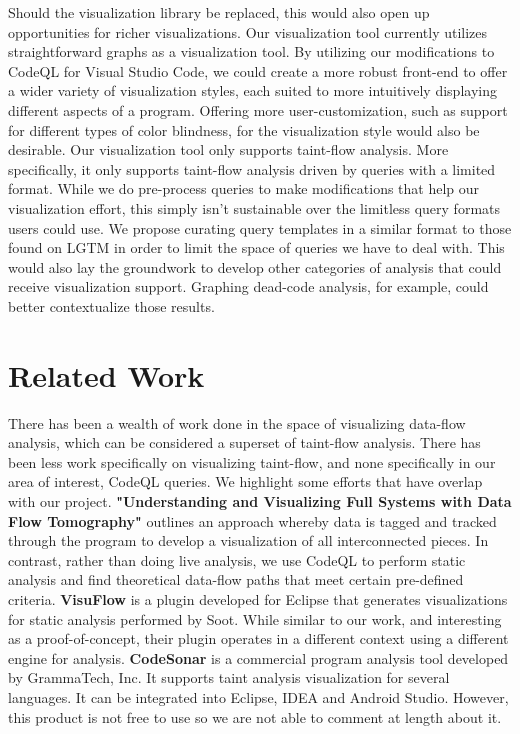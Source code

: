 \documentclass[sigplan,10pt,review]{acmart}
\begin{document}
\indent Should the visualization library be replaced, this would also open up opportunities for richer visualizations. Our visualization tool currently utilizes straightforward graphs as a visualization tool. By utilizing our modifications to CodeQL for Visual Studio Code, we could create a more robust front-end to offer a wider variety of visualization styles, each suited to more intuitively displaying different aspects of a program. Offering more user-customization, such as support for different types of color blindness, for the visualization style would also be desirable.
\newline
\indent Our visualization tool only supports taint-flow analysis. More specifically, it only supports taint-flow analysis driven by queries with a limited format. While we do pre-process queries to make modifications that help our visualization effort, this simply isn't sustainable over the limitless query formats users could use. We propose curating query templates in a similar format to those found on LGTM in order to limit the space of queries we have to deal with. This would also lay the groundwork to develop other categories of analysis that could receive visualization support. Graphing dead-code analysis, for example, could better contextualize those results.

\section{Related Work}
There has been a wealth of work done in the space of visualizing data-flow analysis, which can be considered a superset of taint-flow analysis. There has been less work specifically on visualizing taint-flow, and none specifically in our area of interest, CodeQL queries. We highlight some efforts that have overlap with our project.
\newline\newline
\indent \textbf{"Understanding and Visualizing Full Systems with Data Flow Tomography"} \cite{10.1145/1353535.1346308} outlines an approach whereby data is tagged and tracked through the program to develop a visualization of all interconnected pieces. In contrast, rather than doing live analysis, we use CodeQL to perform static analysis and find theoretical data-flow paths that meet certain pre-defined criteria.
\newline\newline
\indent \textbf {VisuFlow} \cite{10.1145/3183440.3183470} is a plugin developed for Eclipse that generates visualizations for static analysis performed by Soot. While similar to our work, and interesting as a proof-of-concept, their plugin operates in a different context using a different engine for analysis.
\newline\newline
\indent \textbf {CodeSonar} \cite{CodeSonar} is a commercial program analysis tool developed by GrammaTech, Inc. It supports taint analysis visualization for several languages. It can be integrated into Eclipse, IDEA and Android Studio. However, this product is not free to use so we are not able to comment at length about it.
\end{document}
